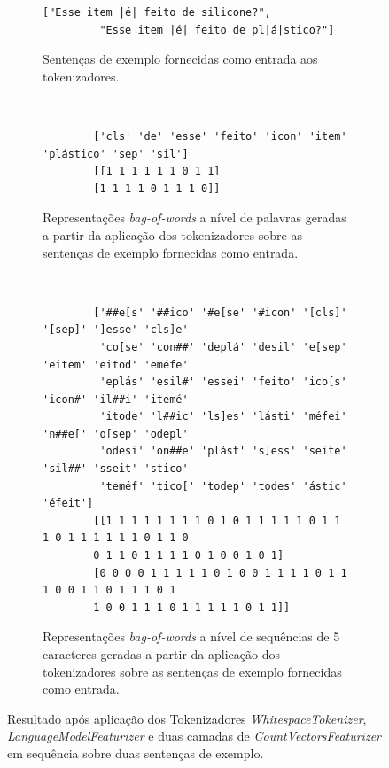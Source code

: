 \begin{figure}[!ht]
    \begin{subfigure}{\linewidth}
        \centering
        \begin{lstlisting}[style=python]
        ["Esse item |é| feito de silicone?", 
         "Esse item |é| feito de pl|á|stico?"]
        \end{lstlisting}
        \caption{Sentenças de exemplo fornecidas como entrada aos tokenizadores.}
    \end{subfigure}
    
    \hrulefill
    \\
    
    \begin{subfigure}{\linewidth}
        \centering
        \begin{verbatim}
        ['cls' 'de' 'esse' 'feito' 'icon' 'item' 'plástico' 'sep' 'sil']
        [[1 1 1 1 1 1 0 1 1]
        [1 1 1 1 0 1 1 1 0]]
        \end{verbatim}
        \caption{Representações \textit{bag-of-words} a nível de palavras geradas a partir da aplicação dos tokenizadores sobre as sentenças de exemplo fornecidas como entrada.}
    \end{subfigure}

    \hrulefill
    \\

    \begin{subfigure}{\linewidth}
        \centering
        \begin{verbatim}
        ['##e[s' '##ico' '#e[se' '#icon' '[cls]' '[sep]' ']esse' 'cls]e' 
         'co[se' 'con##' 'deplá' 'desil' 'e[sep' 'eitem' 'eitod' 'eméfe' 
         'eplás' 'esil#' 'essei' 'feito' 'ico[s' 'icon#' 'il##i' 'itemé' 
         'itode' 'l##ic' 'ls]es' 'lásti' 'méfei' 'n##e[' 'o[sep' 'odepl' 
         'odesi' 'on##e' 'plást' 's]ess' 'seite' 'sil##' 'sseit' 'stico' 
         'teméf' 'tico[' 'todep' 'todes' 'ástic' 'éfeit']
        [[1 1 1 1 1 1 1 1 0 1 0 1 1 1 1 1 0 1 1 1 0 1 1 1 1 1 1 0 1 1 0
        0 1 1 0 1 1 1 1 0 1 0 0 1 0 1]
        [0 0 0 0 1 1 1 1 1 0 1 0 0 1 1 1 1 0 1 1 1 0 0 1 1 0 1 1 1 0 1
        1 0 0 1 1 1 0 1 1 1 1 1 0 1 1]]
        \end{verbatim}
        \caption{Representações \textit{bag-of-words} a nível de sequências de 5 caracteres geradas a partir da aplicação dos tokenizadores sobre as sentenças de exemplo fornecidas como entrada.}
    \end{subfigure}

    \caption{Resultado após aplicação dos Tokenizadores \textit{WhitespaceTokenizer}, \textit{LanguageModelFeaturizer} e duas camadas de \textit{CountVectorsFeaturizer} em sequência sobre duas sentenças de exemplo.}
    \label{fig:rasa_tokenizers}
\end{figure}

